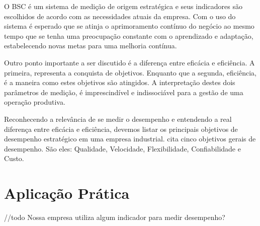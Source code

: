 O BSC é um sistema de medição de origem estratégica e seus indicadores são escolhidos de acordo com as necessidades atuais da empresa. Com o uso do sistema é esperado que se atinja o aprimoramento contínuo do negócio ao mesmo tempo que se tenha uma preocupação constante com o aprendizado e adaptação, estabelecendo novas metas para uma melhoria contínua.

Outro ponto importante a ser discutido é a diferença entre eficácia e eficiência. A primeira, representa a conquista de objetivos. Enquanto que a segunda, eficiência, é a maneira como estes objetivos são atingidos. A interpretação destes dois parâmetros de medição, é imprescindível e indissociável para a gestão de uma operação produtiva.

Reconhecendo a relevância de se medir o desempenho e entendendo a real diferença entre eficácia e eficiência, devemos listar os principais objetivos de desempenho estratégico em uma empresa industrial. %
\cite{slack2006administracao} cita cinco objetivos gerais de desempenho. São eles: Qualidade, Velocidade, Flexibilidade, Confiabilidade e Custo.

\section{Aplicação Prática}
\label{sec:estrategia_da_producao_aplicacao}

//todo Nossa empresa utiliza algum indicador para medir desempenho? 